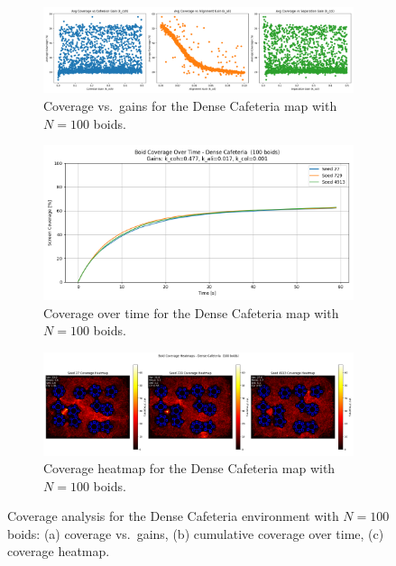 \documentclass[12pt]{article}
\begin{document}
\begin{figure}[h!]
  \centering
  \begin{subfigure}[b]{0.32\linewidth}
    \includegraphics[width=\linewidth]{cov_vs_gains/dense_100.png}
    \caption{Coverage vs.~gains for the Dense Cafeteria map with $N=100$ boids.}
    \label{fig:app:dense100_gains}
  \end{subfigure}\hfill
  \begin{subfigure}[b]{0.32\linewidth}
    \includegraphics[width=\linewidth]{optimal_cov_vs_time/dense_100.png}
    \caption{Coverage over time for the Dense Cafeteria map with $N=100$ boids.}
    \label{fig:app:dense100_time}
  \end{subfigure}\hfill
  \begin{subfigure}[b]{0.32\linewidth}
    \includegraphics[width=\linewidth]{heatmaps/dense_100.png}
    \caption{Coverage heatmap for the Dense Cafeteria map with $N=100$ boids.}
    \label{fig:app:dense100_heat}
  \end{subfigure}
  \caption{Coverage analysis for the Dense Cafeteria environment with $N=100$ boids: (a) coverage vs.~gains, (b) cumulative coverage over time, (c) coverage heatmap.}
  \label{fig:app:densecaf100}
\end{figure}
\end{document}
